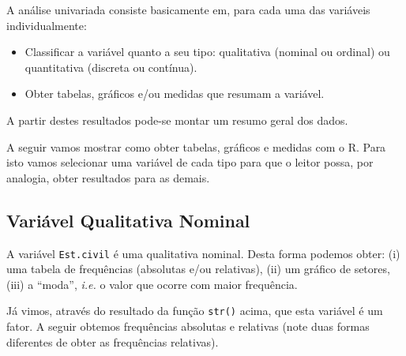 \documentclass[
  10pt,
  a4paper]{book}
\newenvironment{Shaded}{\begin{snugshade}}{\end{snugshade}}
\newcommand{\DecValTok}[1]{\textcolor[rgb]{0.00,0.00,0.81}{#1}}
\newcommand{\DocumentationTok}[1]{\textcolor[rgb]{0.56,0.35,0.01}{\textbf{\textit{#1}}}}
\newcommand{\FloatTok}[1]{\textcolor[rgb]{0.00,0.00,0.81}{#1}}
\newcommand{\FunctionTok}[1]{\textcolor[rgb]{0.00,0.00,0.00}{#1}}
\newcommand{\NormalTok}[1]{#1}
\newcommand{\OtherTok}[1]{\textcolor[rgb]{0.56,0.35,0.01}{#1}}
\newcommand{\SpecialCharTok}[1]{\textcolor[rgb]{0.00,0.00,0.00}{#1}}
\providecommand{\tightlist}{%
  \setlength{\itemsep}{0pt}\setlength{\parskip}{0pt}}
\begin{document}
A análise univariada consiste basicamente em, para cada uma das
variáveis individualmente:

\begin{itemize}
\tightlist
\item
  Classificar a variável quanto a seu tipo: qualitativa (nominal ou
  ordinal) ou quantitativa (discreta ou contínua).
\item
  Obter tabelas, gráficos e/ou medidas que resumam a variável.
\end{itemize}

A partir destes resultados pode-se montar um resumo geral dos dados.

A seguir vamos mostrar como obter tabelas, gráficos e medidas com o R.
Para isto vamos selecionar uma variável de cada tipo para que o leitor
possa, por analogia, obter resultados para as demais.

\hypertarget{variuxe1vel-qualitativa-nominal}{%
\subsection{Variável Qualitativa Nominal}\label{variuxe1vel-qualitativa-nominal}}

A variável \texttt{Est.civil} é uma qualitativa nominal. Desta forma podemos
obter: (i) uma tabela de frequências (absolutas e/ou relativas), (ii) um
gráfico de setores, (iii) a ``moda'', \emph{i.e.} o valor que ocorre com maior
frequência.

Já vimos, através do resultado da função \texttt{str()} acima, que esta
variável é um fator. A seguir obtemos frequências absolutas e relativas
(note duas formas diferentes de obter as frequências relativas).

\begin{Shaded}
\end{Shaded}
\end{document}
